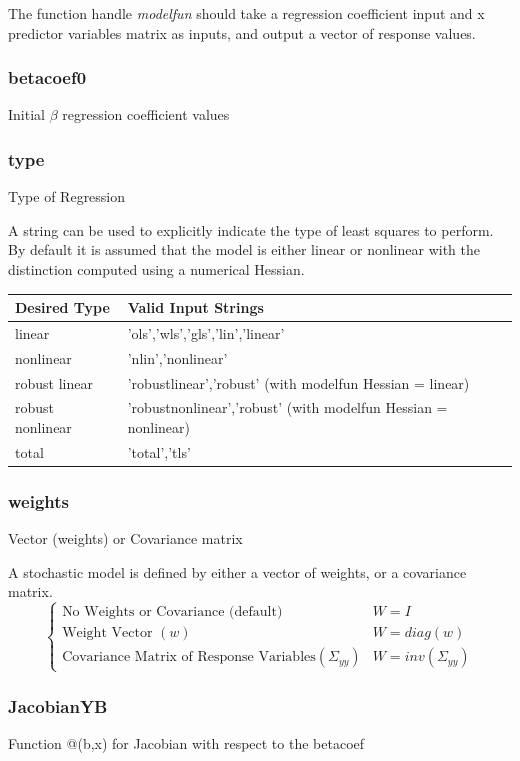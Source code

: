\documentclass{article}
\begin{document}
	The function handle \textit{modelfun} should take a regression coefficient input and x predictor variables matrix as inputs, and output a vector of response values.
	\subsubsection{betacoef0}
	Initial $\beta$ regression coefficient values
	
	\subsubsection{type}
	Type of Regression
	
	A string can be used to explicitly indicate the type of least squares to perform.  By default it is assumed that the model is either linear or nonlinear with the distinction computed using a numerical Hessian.
	\begin{table}[H]
		\begin{tabular}{l|l}
			\toprule
			Desired Type & Valid Input Strings \\
			\midrule
			linear & 'ols','wls','gls','lin','linear'\\
			nonlinear & 'nlin','nonlinear'\\
			robust linear & 'robustlinear','robust' (with modelfun Hessian = linear)\\
			robust nonlinear & 'robustnonlinear','robust' (with modelfun Hessian = nonlinear) \\
			total & 'total','tls'\\
			\bottomrule
		\end{tabular}
	\end{table}
	\subsubsection{weights}
	Vector (weights) or Covariance matrix
	
	A stochastic model is defined by either a vector of weights, or a covariance matrix.
	\[
	\begin{cases}
	\text{No Weights or Covariance (default)} & W = I \\
	\text{Weight Vector } (w) & W = diag(w)  \\
	\text{Covariance Matrix of Response Variables}(\Sigma_{yy}) & W = inv(\Sigma_{yy})
	\end{cases}
	\]
	\subsubsection{JacobianYB}
	Function @(b,x) for Jacobian with respect to the betacoef
	
\end{document}
